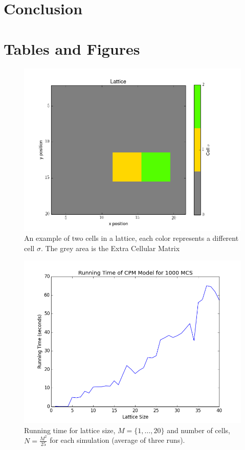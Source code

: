 \documentclass[12pt]{article}
\begin{document}
\section{Conclusion}


\pagebreak
\section{Tables and Figures}

\begin{figure}[h]
	\centering
	\includegraphics[scale=0.5]{img/basic}
	\caption{An example of two cells in a lattice, each color represents a different cell $\sigma$. The grey area is the Extra Cellular Matrix}
	\label{basic}
\end{figure}

\begin{figure}[h]
	\centering
	\includegraphics[scale=0.5]{img/runningtime}
	\caption{Running time for lattice size, $M =\{1,\ldots, 20\}$ and number of cells, $N=\frac{M^2}{25}$ for each simulation (average of three runs).}
	\label{runningtime}
\end{figure}
\end{document}
